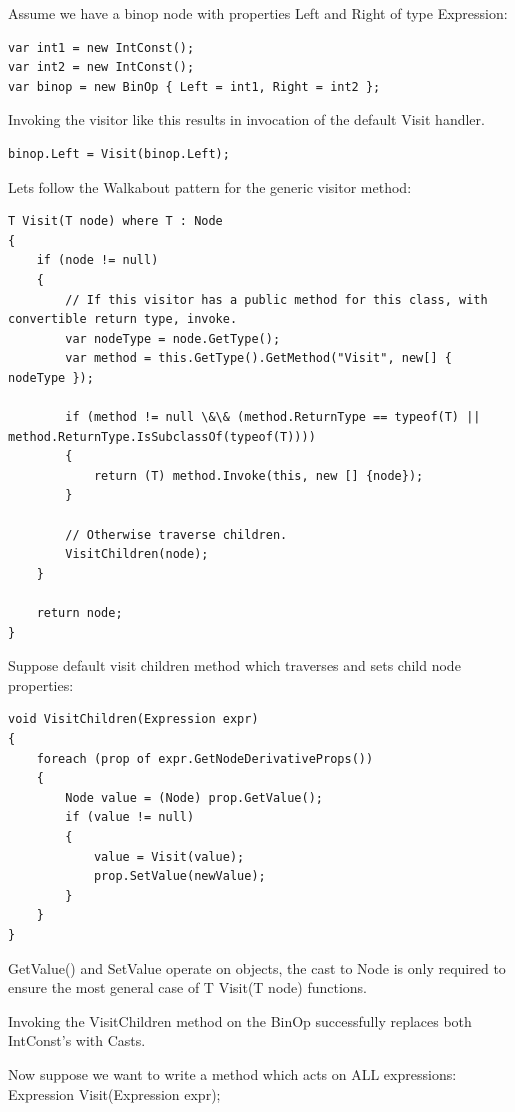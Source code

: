 \documentclass[twoside,openright]{uva-bachelor-thesis}
\begin{document}
			Assume we have a binop node with properties Left and Right of type Expression:
			\begin{lstlisting}[caption=Spanning tree broadcast algorithm.]
var int1 = new IntConst();
var int2 = new IntConst();
var binop = new BinOp { Left = int1, Right = int2 };
			\end{lstlisting}
			
			Invoking the visitor like this results in invocation of the default Visit handler.
			\begin{lstlisting}[caption=Spanning tree broadcast algorithm.]
binop.Left = Visit(binop.Left);
			\end{lstlisting}
			
			Lets follow the Walkabout pattern for the generic visitor method:
			\begin{lstlisting}[caption=Spanning tree broadcast algorithm.]
T Visit(T node) where T : Node
{
	if (node != null)
	{
		// If this visitor has a public method for this class, with convertible return type, invoke.
		var nodeType = node.GetType();
		var method = this.GetType().GetMethod("Visit", new[] { nodeType });
		
		if (method != null \&\& (method.ReturnType == typeof(T) || method.ReturnType.IsSubclassOf(typeof(T))))
		{
			return (T) method.Invoke(this, new [] {node});
		}
		
		// Otherwise traverse children.
		VisitChildren(node);
	}
	
	return node;
}
			\end{lstlisting}
			
			Suppose default visit children method which traverses and sets child node properties:
			
			\begin{lstlisting}[caption=Spanning tree broadcast algorithm.]
void VisitChildren(Expression expr)
{
	foreach (prop of expr.GetNodeDerivativeProps())
	{
		Node value = (Node) prop.GetValue();
		if (value != null)
		{
			value = Visit(value);
			prop.SetValue(newValue);
		}
	}
}
			\end{lstlisting}
			
			GetValue() and SetValue operate on objects, the cast to Node is only required to ensure the most general case of T Visit(T node) functions.
			
			Invoking the VisitChildren method on the BinOp successfully replaces both IntConst's with Casts.
			
				Now suppose we want to write a method which acts on ALL expressions:
			Expression Visit(Expression expr);
			
\end{document}
